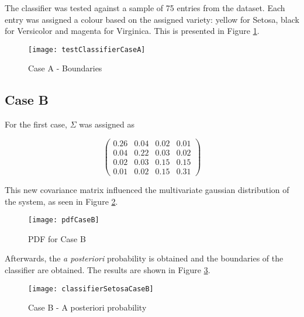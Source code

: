 \pagebreak
\newpage


The classifier was tested against a sample of 75 entries from the dataset. Each entry was assigned a colour based on the assigned variety:
yellow for Setosa, black for Versicolor and magenta for Virginica.
This is presented in Figure \ref{fig: classifier case A}.

\begin{figure}[htb!]
\centering
 \texttt{[image: testClassifierCaseA]}
 \caption{Case A - Boundaries}
 \label{fig: classifier case A}
\end{figure}




\pagebreak
\newpage

\pagebreak
\newpage

\subsection{Case B}
For the first case, $\Sigma$ was assigned as

\begin{equation*}
 \begin{pmatrix}
  0.26 & 0.04 &  0.02 & 0.01 \\
  0.04 &  0.22 & 0.03 & 0.02 \\
  0.02 & 0.03 & 0.15 & 0.15\\
  0.01 & 0.02 &  0.15 & 0.31
 \end{pmatrix}
\end{equation*}

This new covariance matrix influenced the multivariate gaussian distribution of the system,
as seen in Figure \ref{fig: case b PDF}.

\begin{figure}[htb!]
 \texttt{[image: pdfCaseB]}
 \caption{PDF for Case B}
 \label{fig: case b PDF}
\end{figure}

\pagebreak
\newpage


Afterwards, the \emph{a posteriori} probability is obtained and the boundaries of the classifier are obtained.
The results are shown in Figure \ref{fig: posteriori case B}.

\begin{figure}[htb!]
\centering
 \texttt{[image: classifierSetosaCaseB]}
 \caption{Case B - A posteriori probability}
 \label{fig: posteriori case B}
\end{figure}

